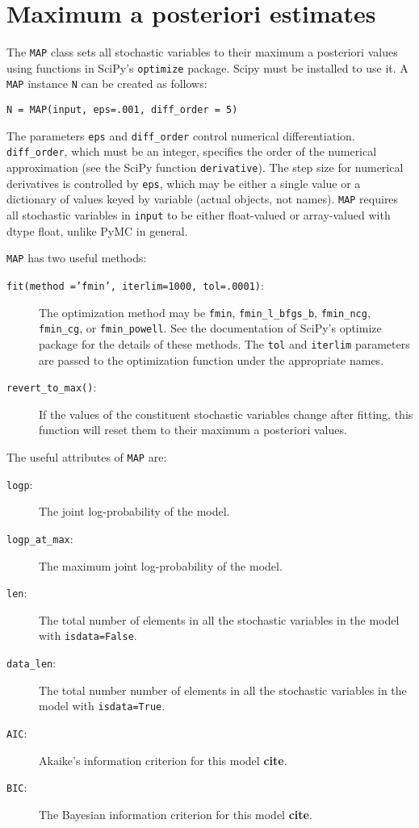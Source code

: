 \section{Maximum a posteriori estimates} 

The \texttt{MAP} class sets all stochastic variables to their maximum a posteriori values using functions in SciPy's \texttt{optimize} package. Scipy must be installed to use it. A \texttt{MAP} instance \texttt{N} can be created as follows:
\begin{verbatim}
N = MAP(input, eps=.001, diff_order = 5)    
\end{verbatim}
The parameters \texttt{eps} and \texttt{diff_order} control numerical differentiation. \texttt{diff_order}, which must be an integer, specifies the order of the numerical approximation (see the SciPy function \texttt{derivative}). The step size for numerical derivatives is controlled by \texttt{eps}, which may be either a single value or a dictionary of values keyed by variable (actual objects, not names). \texttt{MAP} requires all stochastic variables in \texttt{input} to be either float-valued or array-valued with dtype float, unlike PyMC in general.

\texttt{MAP} has two useful methods:
\begin{description}
    \item[\texttt{fit(method ='fmin', iterlim=1000, tol=.0001)}:] The optimization method may be \texttt{fmin}, \texttt{fmin_l_bfgs_b}, \texttt{fmin_ncg}, \texttt{fmin_cg}, or \texttt{fmin_powell}. See the documentation of SciPy's optimize package for the details of these methods. The \texttt{tol} and \texttt{iterlim} parameters are passed to the optimization function under the appropriate names.
    \item[\texttt{revert_to_max()}:] If the values of the constituent stochastic variables change after fitting, this function will reset them to their maximum a posteriori values.
\end{description}

The useful attributes of \texttt{MAP} are:
\begin{description}
    \item[\texttt{logp}:] The joint log-probability of the model.
    \item[\texttt{logp_at_max}:] The maximum joint log-probability of the model.
    \item[\texttt{len}:] The total number of elements in all the stochastic variables in the model with \texttt{isdata=False}.
    \item[\texttt{data_len}:] The total number number of elements in all the stochastic variables in the model with \texttt{isdata=True}.
    \item[\texttt{AIC}:] Akaike's information criterion for this model \textbf{cite}.
    \item[\texttt{BIC}:] The Bayesian information criterion for this model \textbf{cite}.
\end{description}

